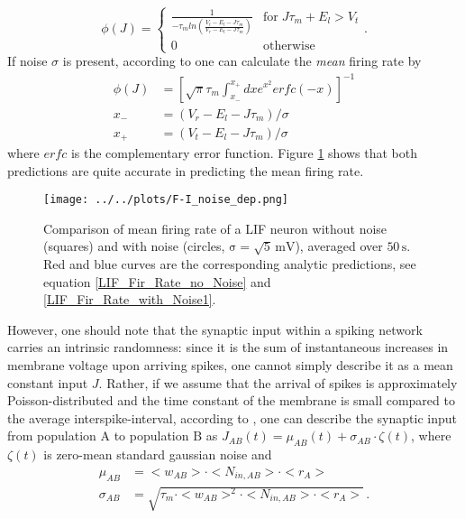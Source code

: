 \documentclass[10pt,a4paper]{article}
\begin{document}
\begin{equation}
\phi(J) = \begin{cases}\frac{1}{-\tau_m ln(\frac{V_t -E_l-J\tau_m}{V_r -E_l-J\tau_m})} & \mathrm{for}\; J\tau_m + E_l > V_t\\
0 & \mathrm{otherwise}
\end{cases}.
\label{LIF_Fir_Rate_no_Noise}
\end{equation}
If noise $\sigma$ is present, according to \cite{Roxin_Firing_Rate_Distribution} one can calculate the \emph{mean} firing rate by
\begin{align}
\phi(J) &= \left[ \sqrt{\pi}\tau_m \int_{x_-}^{x_+} dx e^{x^2} erfc(-x) \right]^{-1} \label{LIF_Fir_Rate_with_Noise1}\\
x_- &= (V_r-E_l-J\tau_m)/\sigma \label{LIF_Fir_Rate_with_Noise2}\\
x_+ &= (V_t-E_l-J\tau_m)/\sigma \label{LIF_Fir_Rate_with_Noise3}
\end{align}
where $erfc$ is the complementary error function. Figure \ref{F-I_noise_dep} shows that both predictions are quite accurate in predicting the mean firing rate. 
\begin{figure}
\begin{center}
\texttt{[image: ../../plots/F-I\_noise\_dep.png]}
\end{center}
\caption{Comparison of mean firing rate of a LIF neuron without noise (squares) and with noise (circles, $\mathrm{\sigma = \sqrt{5}\, mV}$), averaged over $\mathrm{50\, s}$. Red and blue curves are the corresponding analytic predictions, see equation \ref{LIF_Fir_Rate_no_Noise} and \ref{LIF_Fir_Rate_with_Noise1}.}
\label{F-I_noise_dep}
\end{figure}
However, one should note that the synaptic input within a spiking network carries an intrinsic randomness: since it is the sum of instantaneous increases in membrane voltage upon arriving spikes, one cannot simply describe it as a mean constant input $J$. Rather, if we assume that the arrival of spikes is approximately Poisson-distributed and the time constant of the membrane is small compared to the average interspike-interval, according to \cite{Roxin_Firing_Rate_Distribution}, one can describe the synaptic input from population $\mathrm{A}$ to population $\mathrm{B}$ as $J_{AB}(t) = \mu_{AB} (t) + \sigma_{AB} \cdot \zeta(t)$, where $\zeta(t)$ is zero-mean standard gaussian noise and
\begin{align}
\mu_{AB} &= <w_{AB}> \cdot <N_{in,AB}> \cdot <r_A> \label{Noise_Approx_1}\\
\sigma_{AB} &= \sqrt{\tau_m \cdot <w_{AB}>^2 \cdot <N_{in,AB}> \cdot <r_A>} \label{Noise_Approx_2} \, .
\end{align}
\end{document}
